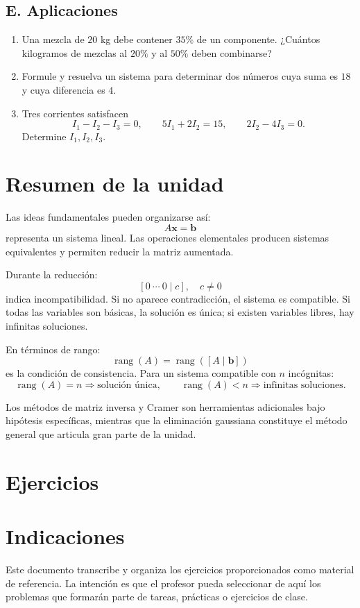 \documentclass[12pt]{article}
\theoremstyle{remark}
\newcommand{\rank}{\operatorname{rang}}
\begin{document}
\subsection*{E. Aplicaciones}
\begin{enumerate}
\item Una mezcla de $20$ kg debe contener $35\%$ de un componente. ¿Cuántos kilogramos de mezclas
al $20\%$ y al $50\%$ deben combinarse?
\item Formule y resuelva un sistema para determinar dos números cuya suma es $18$ y cuya diferencia
es $4$.
\item Tres corrientes satisfacen
\[
I_1-I_2-I_3=0,\qquad 5I_1+2I_2=15,\qquad 2I_2-4I_3=0.
\]
Determine $I_1,I_2,I_3$.
\end{enumerate}

\section{Resumen de la unidad}

Las ideas fundamentales pueden organizarse así:
\[
A\mathbf x=\mathbf b
\]
representa un sistema lineal. Las operaciones elementales producen sistemas equivalentes y permiten
reducir la matriz aumentada.

Durante la reducción:
\[
[0\ \cdots\ 0\mid c],\quad c\neq0
\]
indica incompatibilidad. Si no aparece contradicción, el sistema es compatible. Si todas las variables
son básicas, la solución es única; si existen variables libres, hay infinitas soluciones.

En términos de rango:
\[
\boxed{\rank(A)=\rank([A\mid\mathbf b])}
\]
es la condición de consistencia. Para un sistema compatible con $n$ incógnitas:
\[
\rank(A)=n\Longrightarrow\text{solución única},
\qquad
\rank(A)<n\Longrightarrow\text{infinitas soluciones}.
\]

Los métodos de matriz inversa y Cramer son herramientas adicionales bajo hipótesis específicas, mientras
que la eliminación gaussiana constituye el método general que articula gran parte de la unidad.

\section{Ejercicios}

\section*{Indicaciones}
Este documento transcribe y organiza los ejercicios proporcionados como material de referencia.
La intención es que el profesor pueda seleccionar de aquí los problemas que formarán parte de
tareas, prácticas o ejercicios de clase.
\end{document}
